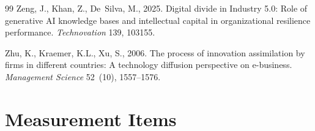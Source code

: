 \documentclass[12pt, a4paper]{article}
\begin{document}
\begin{thebibliography}{99}
Zeng, J., Khan, Z., De~Silva, M., 2025. Digital divide in Industry 5.0: Role of generative AI knowledge bases and intellectual capital in organizational resilience performance. \textit{Technovation} 139, 103155.

Zhu, K., Kraemer, K.L., Xu, S., 2006. The process of innovation assimilation by firms in different countries: A technology diffusion perspective on e-business. \textit{Management Science} 52~(10), 1557--1576.

\end{thebibliography}

\appendix
\section{Measurement Items}
\end{document}
